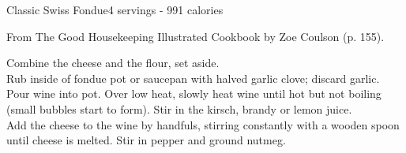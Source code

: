 \begin{recipe}{Classic Swiss Fondue}{4 servings - 991 calories}{}

\freeform From {\normalfont The Good Housekeeping Illustrated Cookbook} by Zoe Coulson (p. 155).


Combine the cheese and the flour, set aside.\\

Rub inside of fondue pot or saucepan with halved garlic clove; discard garlic.\\

Pour wine into pot. Over low heat, slowly heat wine until hot but not boiling (small bubbles start to form). Stir in the kirsch, brandy or lemon juice.\\ 

Add the cheese to the wine by handfuls, stirring constantly with a wooden spoon until cheese is melted. Stir in pepper and ground nutmeg.

\end{recipe}
